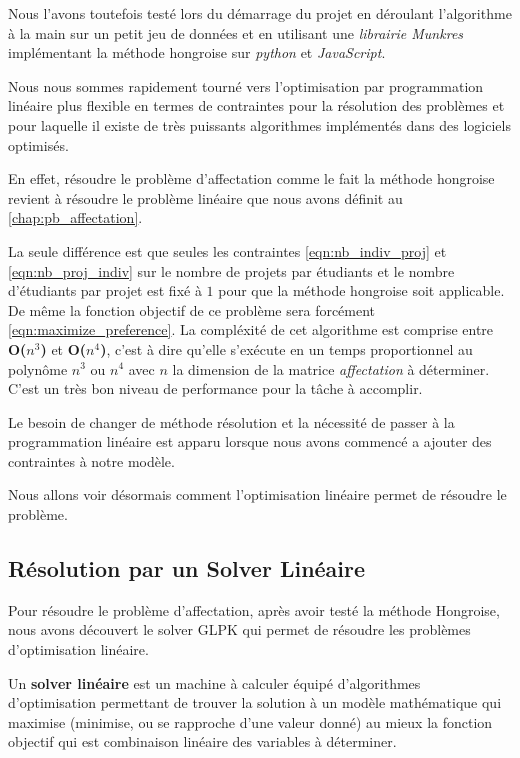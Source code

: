 \documentclass[final,poster]{polytech/polytech}
\begin{document}
Nous l'avons toutefois testé lors du démarrage du projet en déroulant l'algorithme à la main sur un petit jeu de données et en utilisant une \textit{librairie Munkres} implémentant la méthode hongroise sur \textit{python} et \textit{JavaScript}.


Nous nous sommes rapidement tourné vers l'optimisation par programmation linéaire plus flexible en termes de contraintes pour la résolution des problèmes et pour laquelle il existe de très puissants algorithmes implémentés dans des logiciels optimisés.

En effet, résoudre le problème d'affectation comme le fait la méthode hongroise revient à résoudre le problème linéaire que nous avons définit au \autoref{chap:pb_affectation}.

La seule différence est que seules les contraintes \autoref{eqn:nb_indiv_proj} et \autoref{eqn:nb_proj_indiv} sur le nombre de projets par étudiants et le nombre d'étudiants par projet est fixé à $1$ pour que la méthode hongroise soit applicable.
De même la fonction objectif de ce problème sera forcément \autoref{eqn:maximize_preference}. La compléxité de cet algorithme est comprise entre \textbf{O($n^3$)} et  \textbf{O($n^4$)}, c'est à dire qu'elle s'exécute en un temps proportionnel au polynôme $n^3$ ou $n^4$ avec $n$ la dimension de la matrice \textit{affectation} à déterminer. C'est un très bon niveau de performance pour la tâche à accomplir.

Le besoin de changer de méthode résolution et la nécessité de passer à la programmation linéaire est apparu lorsque nous avons commencé a ajouter des contraintes à notre modèle.

Nous allons voir désormais comment l'optimisation linéaire permet de résoudre le problème.

\subsection{Résolution par un Solver Linéaire}

Pour résoudre le problème d'affectation, après avoir testé la méthode Hongroise, nous avons découvert le solver GLPK qui permet de résoudre les problèmes d'optimisation linéaire.

Un \textbf{solver linéaire}  est un machine à calculer équipé d'algorithmes d'optimisation permettant de trouver la solution à un modèle mathématique qui maximise (minimise, ou se rapproche d'une valeur donné) au mieux la fonction objectif qui est combinaison linéaire des variables à déterminer.
\end{document}

